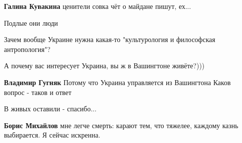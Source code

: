 \begin{itemize}
\begin{itemize}
\textbf{Галина Кувакина} ценители совка чёт о майдане пишут, ех...
\end{itemize}

 
Подлые они люди

 
Зачем вообще Украине нужна какая-то "культурология и философская антропология"?

\begin{itemize}
 
А почему вас интересует Украина, вы ж в Вашингтоне живёте?)))

 
\textbf{Владимир Гугняк} Потому что Украина управляется из Вашингтона \Smiley[1.0][yellow] Каков вопрос - таков и ответ 🤣
\end{itemize}

 
В живых оставили - спасибо...

\begin{itemize}
 
\textbf{Борис Михайлов} мне легче смерть: карают тем, что тяжелее, каждому казнь выбирается. Я сейчас искренна.
\end{itemize}


\end{itemize}
